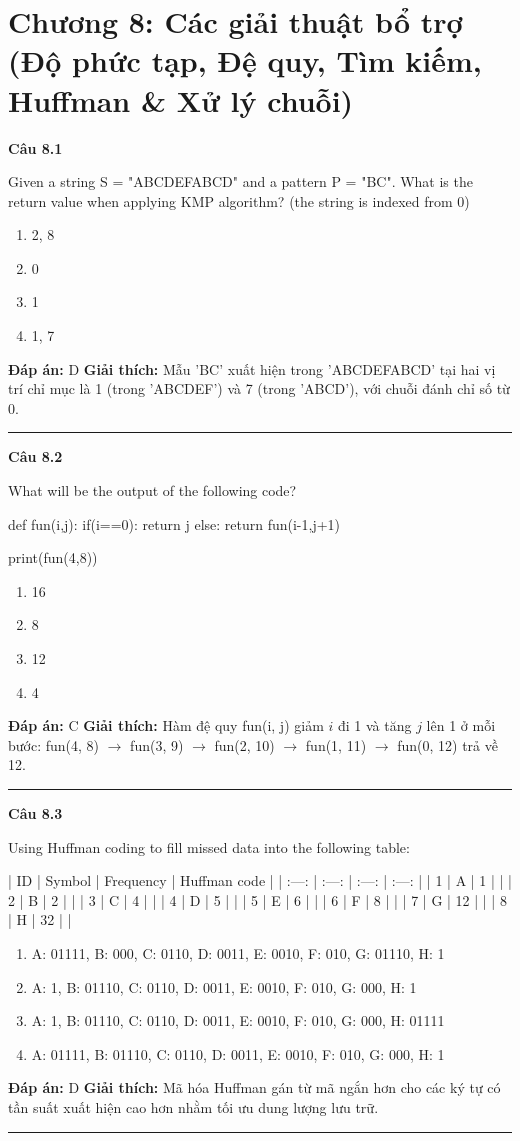 \documentclass[11pt,a4paper]{article}
\newenvironment{question}[1]{%
  \par\vspace{1em}\noindent\textbf{\large Câu #1}\par\vspace{0.4em}
}{%
  \par\vspace{1em}\hrule\vspace{0.6em}
}
\newenvironment{choices}{%
  \begin{enumerate}[label=\textbf{\Alph*.},leftmargin=2.2em,itemsep=2pt,topsep=3pt]
}{%
  \end{enumerate}
}
\newcommand{\choice}{\item}
\newenvironment{codebox}{%
  \begin{tcolorbox}[colback=gray!8!white,colframe=gray!50!black,arc=1.5mm,boxrule=0.6pt,left=3mm,right=3mm,top=2.5mm,bottom=2.5mm]
  \ttfamily\small
}{%
  \end{tcolorbox}
}
\begin{document}
\newpage
\section*{Chương 8: Các giải thuật bổ trợ (Độ phức tạp, Đệ quy, Tìm kiếm, Huffman & Xử lý chuỗi)}


\begin{question}{8.1}
Given a string S = "ABCDEFABCD" and a pattern P = "BC". What is the return value when applying KMP algorithm? (the string is indexed from 0)
\begin{choices}
\choice 2, 8
\choice 0
\choice 1
\choice 1, 7
\end{choices}
\textbf{Đáp án:} D
\textbf{Giải thích:} Mẫu 'BC' xuất hiện trong 'ABCDEFABCD' tại hai vị trí chỉ mục là 1 (trong 'ABCDEF') và 7 (trong 'ABCD'), với chuỗi đánh chỉ số từ 0.
\end{question}

\begin{question}{8.2}
What will be the output of the following code?
\begin{codebox}
def fun(i,j):
  if(i==0):
    return j
  else:
    return fun(i-1,j+1)

print(fun(4,8))
\end{codebox}
\begin{choices}
\choice 16
\choice 8
\choice 12
\choice 4
\end{choices}
\textbf{Đáp án:} C
\textbf{Giải thích:} Hàm đệ quy fun(i, j) giảm \(i\) đi 1 và tăng \(j\) lên 1 ở mỗi bước: fun(4, 8) \(\to\) fun(3, 9) \(\to\) fun(2, 10) \(\to\) fun(1, 11) \(\to\) fun(0, 12) trả về 12.
\end{question}

\begin{question}{8.3}
Using Huffman coding to fill missed data into the following table:

| ID | Symbol | Frequency | Huffman code |
| :---: | :---: | :---: | :---: |
| 1 | A | 1 | |
| 2 | B | 2 | |
| 3 | C | 4 | |
| 4 | D | 5 | |
| 5 | E | 6 | |
| 6 | F | 8 | |
| 7 | G | 12 | |
| 8 | H | 32 | |
\begin{choices}
\choice A: 01111, B: 000, C: 0110, D: 0011, E: 0010, F: 010, G: 01110, H: 1
\choice A: 1, B: 01110, C: 0110, D: 0011, E: 0010, F: 010, G: 000, H: 1
\choice A: 1, B: 01110, C: 0110, D: 0011, E: 0010, F: 010, G: 000, H: 01111
\choice A: 01111, B: 01110, C: 0110, D: 0011, E: 0010, F: 010, G: 000, H: 1
\end{choices}
\textbf{Đáp án:} D
\textbf{Giải thích:} Mã hóa Huffman gán từ mã ngắn hơn cho các ký tự có tần suất xuất hiện cao hơn nhằm tối ưu dung lượng lưu trữ.
\end{question}
\end{document}
